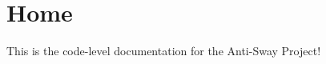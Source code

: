 \chapter{Home}
\hypertarget{md__home}{}\label{md__home}
This is the code-\/level documentation for the Anti-\/\+Sway Project! 